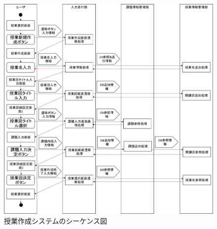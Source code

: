 \begin{figure}[htbp]
  \begin{center}
    \includegraphics[width=1\linewidth,clip]{./img/create_lecture/main.png}
    \caption{授業作成システムのシーケンス図}\label{fig:createlectureseaquence}
  \end{center}
\end{figure}

